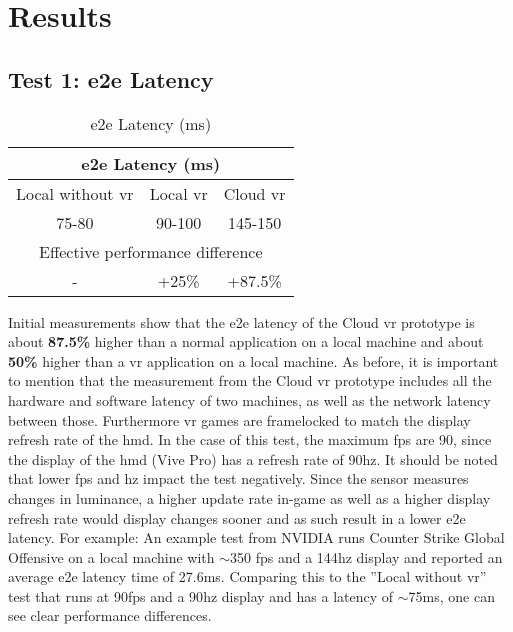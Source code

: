 \section{Results}

\subsection{Test 1: \acrfull{e2e} Latency}
\label{sec:res:t1}
\begin{table}[h!]
\begin{center}
\caption{\acrfull{e2e} Latency (ms)}
\begin{tabular}{ |c|c|c| }
\hline
\multicolumn{3}{|c|}{\acrfull{e2e} Latency (\acrshort{ms})}\\
\hline
\hline
Local without \acrshort{vr} & Local \acrshort{vr} & Cloud \acrshort{vr}\\
\hline
75-80 & 90-100 & 145-150\\
\hline
\multicolumn{3}{|c|}{Effective performance difference}\\
\hline
- & +25\% & +87.5\%\\
\hline
\end{tabular}
\end{center}
\end{table}

Initial measurements show that the \acrshort{e2e} latency of the Cloud \acrshort{vr} prototype is about \textbf{87.5\%} higher than a normal application on a local machine and about \textbf{50\%} higher than a \acrshort{vr} application on a local machine. As before, it is important to mention that the measurement from the Cloud \acrshort{vr}
 prototype includes all the hardware and software latency of two machines, as well as the network latency between those. Furthermore \acrshort{vr} games are framelocked to match the display refresh rate of the \acrshort{hmd}. In the case of this test, the maximum \acrshort{fps} are 90, since the display of the \acrfull{hmd} (Vive Pro) has a refresh rate of 90\acrshort{hz}. 
 It should be noted that lower \acrshort{fps} and \acrshort{hz} impact the test negatively. Since the sensor measures changes in luminance, a higher update rate in-game as well as a higher display refresh rate would display changes sooner and as such result in a lower \acrshort{e2e} latency. For example: An example test from NVIDIA runs Counter Strike Global Offensive on a local machine with $\sim$350 \acrshort{fps} and a 144\acrshort{hz} display and reported an average \acrshort{e2e} latency time of 27.6\acrshort{ms}. Comparing this to the ''Local without \acrshort{vr}'' test that runs at 90\acrshort{fps} and a 90\acrshort{hz} display and has a latency of $\sim$75\acrshort{ms}, one can see clear performance differences.
 

